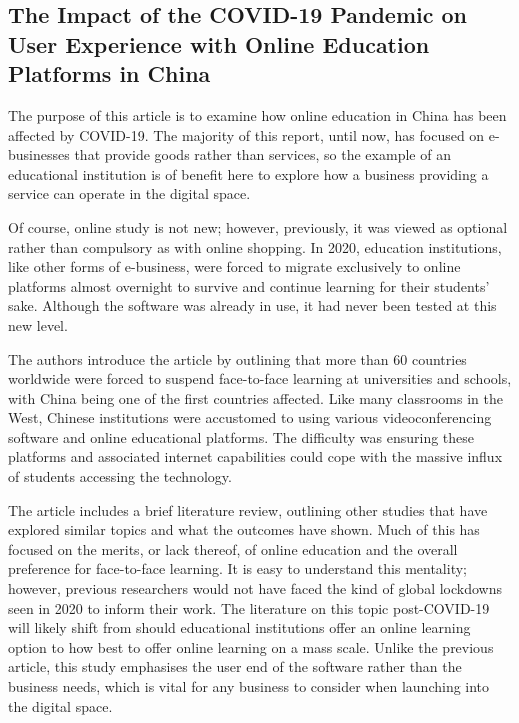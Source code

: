 \documentclass[12pt]{article}
\begin{document}
\subsection{The Impact of the COVID-19 Pandemic on User Experience with Online Education \\ Platforms in China \cite{tinggui}}
The purpose of this article is to examine how online education in China has been affected by COVID-19. The majority of this report, until now, has focused on e-businesses that provide goods rather than services, so the example of an educational institution is of benefit here to explore how a business providing a service can operate in the digital space. \par 

Of course, online study is not new; however, previously, it was viewed as optional rather than compulsory as with online shopping. In 2020, education institutions, like other forms of e-business, were forced to migrate exclusively to online platforms almost overnight to survive and continue learning for their students’ sake. Although the software was already in use, it had never been tested at this new level. \par 

The authors introduce the article by outlining that more than 60 countries worldwide were forced to suspend face-to-face learning at universities and schools, with China being one of the first countries affected. Like many classrooms in the West, Chinese institutions were accustomed to using various videoconferencing software and online educational platforms. The difficulty was ensuring these platforms and associated internet capabilities could cope with the massive influx of students accessing the technology. \par 

The article includes a brief literature review, outlining other studies that have explored similar topics and what the outcomes have shown. Much of this has focused on the merits, or lack thereof, of online education and the overall preference for face-to-face learning. It is easy to understand this mentality; however, previous researchers would not have faced the kind of global lockdowns seen in 2020 to inform their work. The literature on this topic post-COVID-19 will likely shift from should educational institutions offer an online learning option to how best to offer online learning on a mass scale. Unlike the previous article, this study emphasises the user end of the software rather than the business needs, which is vital for any business to consider when launching into the digital space. \par 
\end{document}
